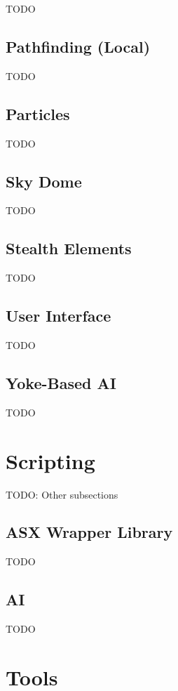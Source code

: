 TODO

\subsection{Pathfinding (Local)}

TODO

\subsection{Particles}

TODO

\subsection{Sky Dome}

TODO

\subsection{Stealth Elements}

TODO

\subsection{User Interface}

TODO

\subsection{Yoke-Based AI}

TODO

\section{Scripting}

TODO: Other subsections

\subsection{ASX Wrapper Library}

TODO

\subsection{AI}

TODO

\section{Tools}

